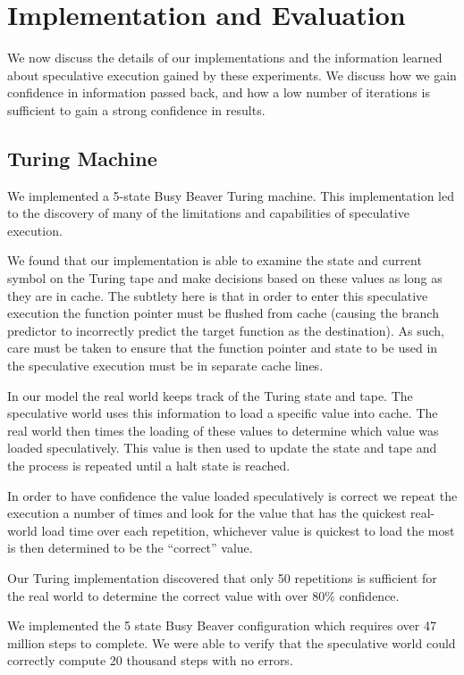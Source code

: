 
\section{Implementation and Evaluation}
We now discuss the details of our implementations and the information learned
about speculative execution gained by these experiments. We discuss how we gain
confidence in information passed back, and how a low number of iterations is
sufficient to gain a strong confidence in results.

\subsection{Turing Machine}
\label{subsec:impl-turing}

We implemented a 5-state Busy Beaver Turing machine.
This implementation led to the discovery of many of the limitations and
capabilities of speculative execution.

We found that our implementation is able to examine the state and current symbol
on the Turing tape and make decisions based on these values as long as they are
in cache. The subtlety here is that in order to enter this speculative execution
the function pointer must be flushed from cache (causing the branch predictor to
incorrectly predict the target function as the destination). As such, care must
be taken to ensure that the function pointer and state to be used in the
speculative execution must be in separate cache lines. 

In our model the real world keeps track of the Turing state and tape. The
speculative world uses this information to load a specific value into cache. The
real world then times the loading of these values to determine which value was
loaded speculatively. This value is then used to update the state and tape and
the process is repeated until a halt state is reached.

In order to have confidence the value loaded speculatively is correct we repeat
the execution a number of times and look for the value that has the quickest
real-world load time over each repetition, whichever value is quickest to load
the most is then determined to be the ``correct'' value.

Our Turing implementation discovered that only 50 repetitions is sufficient for
the real world to determine the correct value with over 80\% confidence.

We implemented the 5 state Busy Beaver configuration which requires over 47
million steps to complete. We were able to verify that the speculative world
could correctly compute 20 thousand steps with no errors.

